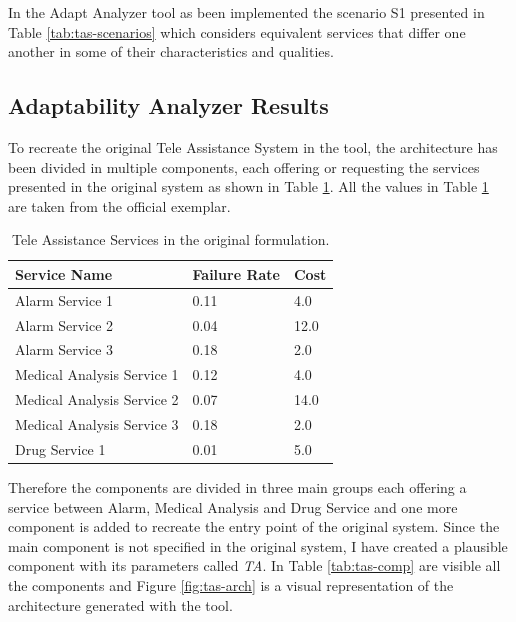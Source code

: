 In the Adapt Analyzer tool as been implemented the scenario S1 presented in Table \ref{tab:tas-scenarios} which considers equivalent services that differ one another in some of their characteristics and qualities.

\clearpage

\subsection{Adaptability Analyzer Results}

To recreate the original Tele Assistance System in the tool, the architecture has been divided in multiple components, each offering or requesting the services presented in the original system as shown in Table \ref{tab:tas-original-services}. All the values in Table \ref{tab:tas-original-services} are taken from the official exemplar\cite{teleassist}.

\begin{table}[ht!b]
	\centering
	\begin{tabular}{|p{5cm}|p{3cm}|p{1cm}|}
		\hline 
		\textbf{Service Name} & \textbf{Failure Rate} & \textbf{Cost} \\ 
		\hline 
		Alarm Service 1 & 0.11 & 4.0 \\
		\hline 
		Alarm Service 2 & 0.04 & 12.0 \\ 
		\hline 
		Alarm Service 3 & 0.18 & 2.0 \\ 
		\hline 
		Medical Analysis Service 1 & 0.12 & 4.0 \\ 
		\hline
		Medical Analysis Service 2 & 0.07 & 14.0 \\ 
		\hline
		Medical Analysis Service 3 & 0.18 & 2.0 \\ 
		\hline
		Drug Service 1 & 0.01 & 5.0 \\ 
		\hline
		
	\end{tabular} 
	\caption[TAS Services]{Tele Assistance Services in the original formulation.}
	\label{tab:tas-original-services}
\end{table}

Therefore the components are divided in three main groups each offering a service between Alarm, Medical Analysis and Drug Service and one more component is added to recreate the entry point of the original system. Since the main component is not specified in the original system, I have created a plausible component with its parameters called \emph{TA}. In Table \ref{tab:tas-comp} are visible all the components and Figure \ref{fig:tas-arch} is a visual representation of the architecture generated with the tool.

